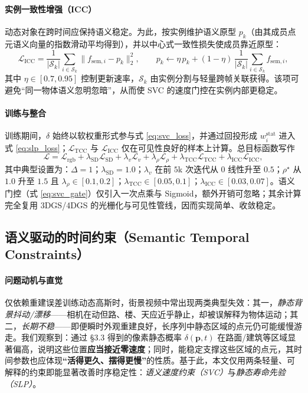 \documentclass[10pt,conference]{IEEEtran} %
\begin{document}
\paragraph{实例一致性增强（ICC）}
动态对象在跨时间应保持语义稳定。为此，按实例维护语义原型 $p_k$（由其成员点元语义向量的指数滑动平均得到），并以中心式一致性损失使成员靠近原型：
\begin{equation}
\mathcal L_{\mathrm{ICC}}=\frac{1}{|\mathcal S_k|}\sum_{i\in\mathcal S_k}\|f_{\mathrm{sem},i}-p_k\|_2^2,\qquad
p_k \leftarrow \eta\,p_k+(1-\eta)\,\frac{1}{|\mathcal S_k|}\sum_{i\in\mathcal S_k} f_{\mathrm{sem},i},
\label{eq:icc}
\end{equation}
其中 $\eta\in[0.7,0.95]$ 控制更新速率，$\mathcal S_k$ 由实例分割与轻量跨帧关联获得。该项可避免“同一物体语义忽明忽暗”，从而使 SVC 的速度门控在实例内部更稳定。

\paragraph{训练与整合}
训练期间，$\delta$ 始终以软权重形式参与式 \eqref{eq:svc_loss}，并通过回投形成 $w_i^{\mathrm{stat}}$ 进入式 \eqref{eq:slp_loss}；$\mathcal L_{\mathrm{TCC}}$ 与 $\mathcal L_{\mathrm{ICC}}$ 仅在可见性良好的样本上计算。总目标函数写作
\begin{equation}
\mathcal L=\mathcal L_{\mathrm{rgb}}+\lambda_{\mathrm{SD}}\mathcal L_{\mathrm{SD}}
+\lambda_v \mathcal L_v+\lambda_\rho \mathcal L_\rho
+\lambda_{\mathrm{TCC}}\mathcal L_{\mathrm{TCC}}
+\lambda_{\mathrm{ICC}}\mathcal L_{\mathrm{ICC}},
\label{eq:total_temporal}
\end{equation}
其中典型设置为：$\Delta{=}1$；$\lambda_{\mathrm{SD}}{=}1.0$；$\lambda_v$ 在前 $5$k 次迭代从 $0$ 线性升至 $0.5$；$\rho^\star$ 从 $1.0$ 升至 $1.5$ 且 $\lambda_\rho\in[0.1,0.2]$；$\lambda_{\mathrm{TCC}}\in[0.05,0.1]$；$\lambda_{\mathrm{ICC}}\in[0.03,0.07]$。语义门控（式 \eqref{eq:svc_gate}）仅引入一次点乘与 Sigmoid，额外开销可忽略；其余计算完全复用 3DGS/4DGS 的光栅化与可见性管线，因而实现简单、收敛稳定。


\subsection{语义驱动的时间约束（Semantic Temporal Constraints）}
\paragraph{问题动机与直觉}
仅依赖重建误差训练动态高斯时，街景视频中常出现两类典型失效：其一，\emph{静态背景抖动/漂移}——相机在动但路、楼、天应近乎静止，却被误解释为物体运动；其二，\emph{长期不稳}——即便瞬时外观重建良好，长序列中静态区域的点元仍可能缓慢游走。我们观察到：通过 §3.3 得到的像素静态概率 $\delta(\mathbf p,t)$ 在路面/建筑等区域显著偏高，说明这些位置\textbf{应当接近零速度}；同时，能稳定支撑这些区域的点元，其时间参数也应体现\textbf{“活得更久、摆得更慢”}的性质。基于此，本文仅用两条轻量、可解释的约束即能显著改善时序稳定性：\emph{语义速度约束（SVC）}与\emph{静态寿命先验（SLP）}。
\end{document}
